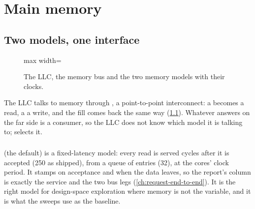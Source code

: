 \chapter{Main memory}\label{ch:main-memory}


\section{Two models, one interface}

\begin{figure}[htbp]\centering
\begin{adjustbox}{max width=\textwidth}\end{adjustbox}
\caption{The LLC, the memory bus and the two memory models with their clocks.}
\label{fig:membus-mcsim}
\end{figure}

The LLC talks to memory through , a point-to-point interconnect: a 
becomes a read, a  a write, and the fill comes back the same way
(\cref{fig:membus-mcsim}). Whatever answers on the far side is a 
consumer, so the LLC does not know which model it is talking to; 
selects it.

\paragraph{} (the default) is a fixed-latency model: every read is
served  cycles after it is accepted (250 as shipped), from a queue of
 entries (32), at the cores' clock period. It stamps
 on acceptance and  when the data leaves, so the report's
 column is exactly the service and  the two bus legs
(\cref{ch:request-end-to-end}). It is the right model for design-space exploration where memory
is not the variable, and it is what the sweeps use as the baseline.

